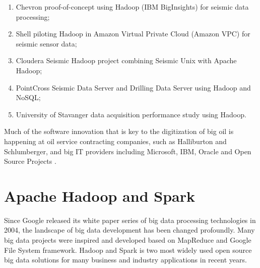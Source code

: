 \begin{enumerate}
  \item Chevron proof-of-concept using Hadoop (IBM BigInsights) for seismic data processing;
  \item Shell piloting Hadoop in Amazon Virtual Private Cloud (Amazon VPC) for seismic sensor data;
  \item Cloudera Seismic Hadoop project combining Seismic Unix with Apache Hadoop;
  \item PointCross Seismic Data Server and Drilling Data Server using Hadoop and NoSQL;
  \item University of Stavanger data acquisition performance study using Hadoop.
\end{enumerate}

Much of the software innovation that is key to the digitization of big oil is happening at oil service contracting companies, such as Halliburton and Schlumberger, and big IT providers including Microsoft, IBM, Oracle and Open Source Projects \cite{bigdatatooil}.

\section{Apache Hadoop and Spark}

Since Google released its white paper series of big data processing technologies in 2004, the landscape of big data development has been changed profoundly. Many big data projects were inspired and developed based on MapReduce and Google File System framework. Hadoop and Spark is two most widely used open source big data solutions for many business and industry applications in recent years. 

